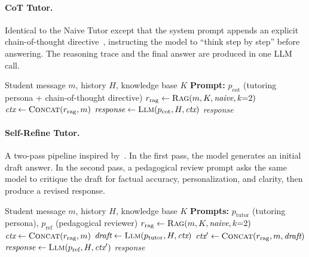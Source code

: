 \paragraph{CoT Tutor.}
Identical to the Naive Tutor except that the system prompt appends an explicit chain-of-thought directive~\citep{wei2022chain}, instructing the model to ``think step by step'' before answering.
The reasoning trace and the final answer are produced in one LLM call.

\begin{algorithm}[ht!]
\caption{CoT Tutor}\label{alg:cot}
\small
\begin{algorithmic}[1]
\Require Student message $m$, history $H$, knowledge base $K$
\Statex \textbf{Prompt:} $p_{\text{cot}}$ (tutoring persona + chain-of-thought directive)
\State $r_{\text{rag}} \gets \textsc{Rag}(m, K, \textit{naive}, k{=}2)$
\State $\textit{ctx} \gets \textsc{Concat}(r_{\text{rag}}, m)$
\State $\textit{response} \gets \textsc{Llm}(p_{\text{cot}}, H, \textit{ctx})$
\State \Return \textit{response}
\end{algorithmic}
\end{algorithm}

\paragraph{Self-Refine Tutor.}
A two-pass pipeline inspired by~\citet{madaan2024selfrefine}.
In the first pass, the model generates an initial draft answer.
In the second pass, a pedagogical review prompt asks the same model to critique the draft for factual accuracy, personalization, and clarity, then produce a revised response.

\begin{algorithm}[ht!]
\caption{Self-Refine Tutor}\label{alg:selfrefine}
\small
\begin{algorithmic}[1]
\Require Student message $m$, history $H$, knowledge base $K$
\Statex \textbf{Prompts:} $p_{\text{tutor}}$ (tutoring persona), $p_{\text{ref}}$ (pedagogical reviewer)
\State $r_{\text{rag}} \gets \textsc{Rag}(m, K, \textit{naive}, k{=}2)$
\State $\textit{ctx} \gets \textsc{Concat}(r_{\text{rag}}, m)$
\State $\textit{draft} \gets \textsc{Llm}(p_{\text{tutor}}, H, \textit{ctx})$ 
\State $\textit{ctx}' \gets \textsc{Concat}(r_{\text{rag}}, m, \textit{draft})$
\State $\textit{response} \gets \textsc{Llm}(p_{\text{ref}}, H, \textit{ctx}')$ 
\State \Return \textit{response}
\end{algorithmic}
\end{algorithm}

